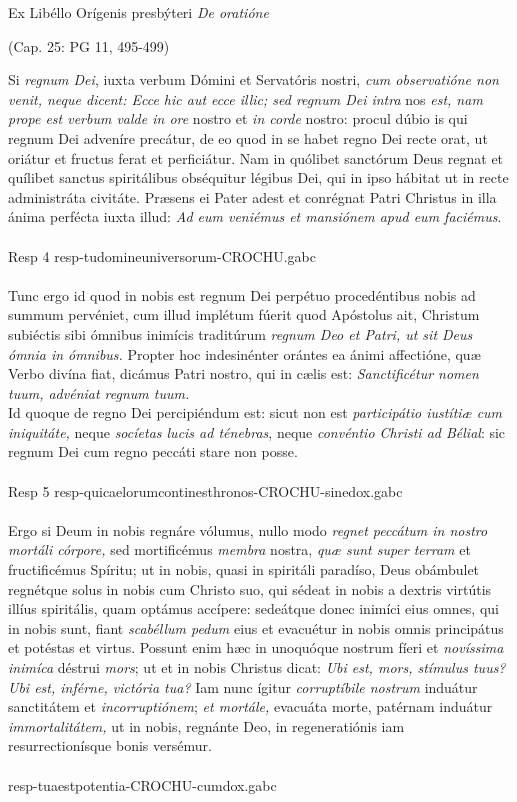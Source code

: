 \documentclass[options]{article}
\begin{document}
	
Ex Libéllo Orígenis presbýteri \emph{De oratióne}
\begin{flushright}
	(Cap. 25: PG 11, 495-499)
\end{flushright}

Si \emph{regnum Dei}, iuxta verbum Dómini et Servatóris nostri, \emph{cum observatióne non venit, neque dicent: Ecce hic aut ecce illic; sed regnum Dei intra} nos \emph{est, nam prope est verbum valde in ore} nostro et \emph{in corde} nostro: procul dúbio is qui regnum Dei adveníre precátur, de eo quod in se habet regno Dei recte orat, ut oriátur et fructus ferat et perficiátur. Nam in quólibet sanctórum Deus regnat et quílibet sanctus spiritálibus obséquitur légibus Dei, qui in ipso hábitat ut in recte administráta civitáte. Præsens ei Pater adest et conrégnat Patri Christus in illa ánima perfécta iuxta illud: \emph{Ad eum veniémus et mansiónem apud eum faciémus}.\\
\\
Resp 4  resp-tudomineuniversorum-CROCHU.gabc\\
\\

Tunc ergo id quod in nobis est regnum Dei perpétuo procedéntibus nobis ad summum pervéniet, cum illud implétum fúerit quod Apóstolus ait, Christum subiéctis sibi ómnibus inimícis traditúrum \emph{regnum Deo et Patri, ut sit Deus ómnia in ómnibus.} Propter hoc indesinénter orántes ea ánimi affectióne, quæ Verbo divína fiat, dicámus Patri nostro, qui in cælis est: \emph{Sanctificétur nomen tuum, advéniat regnum tuum.}\\
 Id quoque de regno Dei percipiéndum est: sicut non est \emph{participátio iustítiæ cum iniquitáte,} neque \emph{socíetas lucis ad ténebras}, neque \emph{convéntio Christi ad Bélial}: sic regnum Dei cum regno peccáti stare non posse.\\
 \\
 Resp 5 resp-quicaelorumcontinesthronos-CROCHU-sinedox.gabc\\
 \\
Ergo si Deum in nobis regnáre vólumus, nullo modo \emph{regnet peccátum in nostro mortáli córpore,} sed mortificémus \emph{membra} nostra, \emph{quæ sunt super terram} et fructificémus Spíritu; ut in nobis, quasi in spiritáli paradíso, Deus obámbulet regnétque solus in nobis cum Christo suo, qui sédeat in nobis a dextris virtútis illíus spiritális, quam optámus accípere: sedeátque donec inimíci eius omnes, qui in nobis sunt, fiant \emph{scabéllum pedum} eius et evacuétur in nobis omnis principátus et potéstas et virtus.
Possunt enim hæc in unoquóque nostrum fíeri et \emph{novíssima inimíca} déstrui \emph{mors}; ut et in nobis Christus dicat: \emph{Ubi est, mors, stímulus tuus? Ubi est, inférne, victória tua?} Iam nunc ígitur \emph{corruptíbile nostrum} induátur sanctitátem et \emph{incorruptiónem}; \emph{et mortále,} evacuáta morte, patérnam induátur \emph{immortalitátem,} ut in nobis, regnánte Deo, in regeneratiónis iam resurrectionísque bonis versémur.\\
\\
resp-tuaestpotentia-CROCHU-cumdox.gabc
\end{document}
